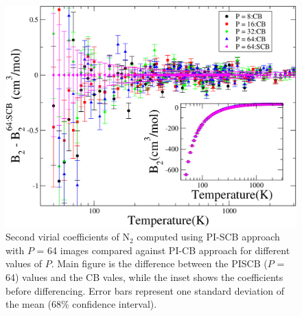             \begin{figure}[!htbp]
                \centering
                \includegraphics[scale=0.20,keepaspectratio]{Chapter-5/Figures/B2N2AllPIDiff.png}
                \caption{Second virial coefficients of N$_2$ computed using PI-SCB approach with $P$ = 64 images compared against PI-CB approach for different values of $P$. Main figure is the difference between the PISCB ($P$ = 64) values and the CB vales, while the inset shows the coefficients before differencing. Error bars represent one standard deviation of the mean (68\% confidence interval).}
                \label{fig:B2N2AllPIDiff}
            \end{figure}

